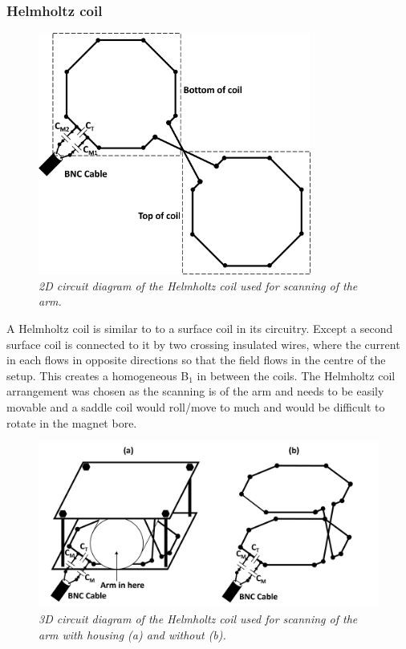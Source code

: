 \subsubsection{Helmholtz coil}

\begin{figure}
    \centering
    \includegraphics[width=0.8\textwidth]{Figures/Theory/Planar_Helmholtz.png}
    \caption{\textit{2D circuit diagram of the Helmholtz coil used for scanning of the arm.}}
    \label{fig:theory:2D_Helmholtz}
\end{figure}

A Helmholtz coil is similar to to a surface coil in its circuitry. Except a second surface coil is connected to it by two crossing insulated wires, where the current in each flows in opposite directions so that the field flows in the centre of the setup. This creates a homogeneous B$_1$ in between the coils. The Helmholtz coil arrangement was chosen as the scanning is of the arm and needs to be easily movable and a saddle coil would roll/move to much and would be difficult to rotate in the magnet bore.

\begin{figure}
    \centering
    \includegraphics[width=1\textwidth]{Figures/Theory/3D_Helmholtz.png}
    \caption{\textit{3D circuit diagram of the Helmholtz coil used for scanning of the arm with housing (a) and without (b).}}
    \label{fig:theory:3D_Helmholtz}
\end{figure}

